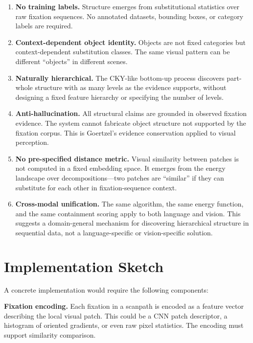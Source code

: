 \documentclass[11pt,a4paper]{article}
\begin{document}
\begin{enumerate}
    \item \textbf{No training labels.} Structure emerges from substitutional statistics over raw fixation sequences. No annotated datasets, bounding boxes, or category labels are required.

    \item \textbf{Context-dependent object identity.} Objects are not fixed categories but context-dependent substitution classes. The same visual pattern can be different ``objects'' in different scenes.

    \item \textbf{Naturally hierarchical.} The CKY-like bottom-up process discovers part-whole structure with as many levels as the evidence supports, without designing a fixed feature hierarchy or specifying the number of levels.

    \item \textbf{Anti-hallucination.} All structural claims are grounded in observed fixation evidence. The system cannot fabricate object structure not supported by the fixation corpus. This is Goertzel's evidence conservation applied to visual perception.

    \item \textbf{No pre-specified distance metric.} Visual similarity between patches is not computed in a fixed embedding space. It emerges from the energy landscape over decompositions---two patches are ``similar'' if they can substitute for each other in fixation-sequence context.

    \item \textbf{Cross-modal unification.} The same algorithm, the same energy function, and the same containment scoring apply to both language and vision. This suggests a domain-general mechanism for discovering hierarchical structure in sequential data, not a language-specific or vision-specific solution.
\end{enumerate}

\section{Implementation Sketch}

A concrete implementation would require the following components:

\textbf{Fixation encoding.} Each fixation in a scanpath is encoded as a feature vector describing the local visual patch. This could be a CNN patch descriptor, a histogram of oriented gradients, or even raw pixel statistics. The encoding must support similarity comparison.
\end{document}

